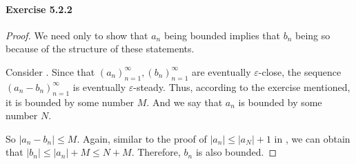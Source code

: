 \paragraph{Exercise 5.2.2} \label{exercise5.2.2}
\begin{proof}
We need only to show that $a_n$ being bounded implies that $b_n$ being so because of the structure of these statements. 

Consider . Since that $(a_n)^\infty_{n=1},(b_n)^\infty_{n=1}$ are eventually $\varepsilon$-close, the sequence 
$(a_n-b_n)^\infty_{n=1}$ is eventually $\varepsilon$-steady. Thus, according to the exercise mentioned, it is bounded by some number $M$. And 
we say that $a_n$ is bounded by some number $N$.

So $|a_n-b_n| \leq M$. Again, similar to the proof of $|a_n| \leq |a_N|+1$ in , we can obtain that 
$|b_n| \leq |a_n| + M \leq N+M$. Therefore, $b_n$ is also bounded.
\end{proof}